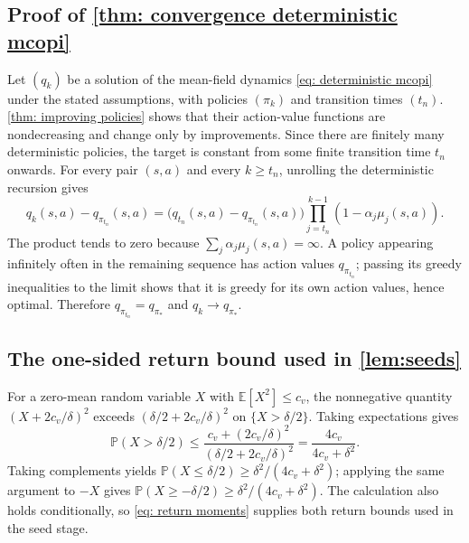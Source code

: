 \documentclass[twoside,11pt]{article}
\DeclareRobustCommand{\reviewbarstart}{%
  \ifhmode %
    \vadjust{\vbox to 0pt{%
      \vskip-\ht\strutbox %
      \vskip-\dp\strutbox %
      \cbstart[\changebarwidth] %
      \vss %
    }}%
  \else %
    \cbstart[\changebarwidth]%
  \fi %
} %
\providecommand{\DIFadd}[1]{#1} %
\providecommand{\DIFaddbegin}{\reviewbarstart} %
\providecommand{\DIFaddend}{\protect\cbend} %
\def\DIFadd#1{#1}%
\def\DIFaddbegin{}%
\def\DIFaddend{}%
\begin{document}
 \DIFaddbegin \subsection{\DIFadd{Proof of \autoref{thm: convergence deterministic mcopi}}}
\label{app: mean field convergence}
\DIFadd{Let $(q_k)$ be a solution of the mean-field dynamics \eqref{eq: deterministic mcopi} under the stated assumptions, with policies $(\pi_k)$ and transition times $(t_n)$.
\autoref{thm: improving policies} shows that their action-value functions are nondecreasing and change only by improvements. Since there are finitely many }\DIFaddend deterministic policies,  \DIFaddbegin \DIFadd{the target is constant from some finite transition time $t_n$ onwards.
For every pair $(s,a)$ and every $k\ge t_n$, unrolling the deterministic recursion gives
}\[
\DIFadd{q_k(s,a)-q_{\pi_{t_n}}(s,a)
=\big(q_{t_n}(s,a)-q_{\pi_{t_n}}(s,a)\big)
\prod_{j=t_n}^{k-1}(1-\alpha_j\mu_j(s,a)).
}\]
\DIFadd{The product tends to zero because $\sum_j\alpha_j\mu_j(s,a)=\infty$.
A policy appearing infinitely often in the remaining sequence has action values $q_{\pi_{t_n}}$; passing its greedy inequalities to the limit shows that it is greedy for its own action values, hence optimal. Therefore $q_{\pi_{t_n}}=q_{\pi_*}$ and $q_k\to q_{\pi_*}$.
}\DIFaddend \hfill\BlackBox

\DIFaddbegin \subsection{\DIFadd{The one-sided return bound used in \autoref{lem:seeds}}}
\label{app: one sided return bound}
\DIFadd{For a zero-mean random variable $X$ with $\mathbb E[X^2]\le c_v$, the nonnegative quantity $(X+2c_v/\delta)^2$ exceeds $(\delta/2+2c_v/\delta)^2$ on $\{X>\delta/2\}$. Taking expectations gives
}\[
\DIFadd{\mathbb P(X>\delta/2)
\le\frac{c_v+(2c_v/\delta)^2}{(\delta/2+2c_v/\delta)^2}
=\frac{4c_v}{4c_v+\delta^2}.
}\]
\DIFadd{Taking complements yields $\mathbb P(X\le\delta/2)\ge\delta^2/(4c_v+\delta^2)$; applying the same argument to $-X$ gives $\mathbb P(X\ge-\delta/2)\ge\delta^2/(4c_v+\delta^2)$. The calculation also holds conditionally, so \eqref{eq: return moments} supplies both return bounds used in the seed stage.
}\DIFaddend 
\end{document}
